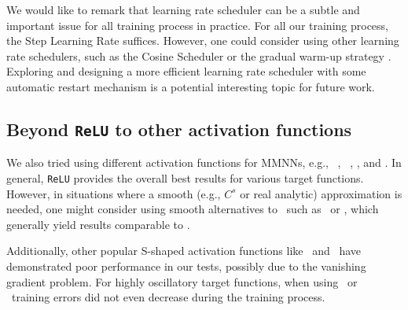 \documentclass[review,hidelinks,onefignum,onetabnum]{siamart250211}
\begin{document}
    We would like to remark that learning rate scheduler can be a subtle and important issue for all training process in practice. For all our training process, the Step Learning Rate suffices. However, one could consider using other learning rate schedulers, such as the Cosine Scheduler \cite{loshchilov2017sgdr} or the gradual warm-up strategy \cite{2017arXiv170602677G}. Exploring and designing a more efficient learning rate scheduler with some automatic restart mechanism is a potential interesting topic for future work.

    


\subsection{Beyond \texttt{ReLU} to other activation functions}
\label{sec:other:activation:functions}

We also tried using different activation functions for MMNNs, e.g., \GELU\ \cite{2016arXiv160608415H}, \Swish\ \cite{2017arXiv171005941R}, \Sigmoid, and \Tanh. In general, \texttt{ReLU} provides the overall best results for various target functions. 
However, in situations where a smooth (e.g., $C^s$ or real analytic) approximation  is needed, one might consider using smooth alternatives to \ReLU\ such as \GELU\  or \Swish, which generally yield results comparable to \ReLU.

Additionally, other popular S-shaped activation functions like \Sigmoid\ and \Tanh\ have demonstrated poor performance in our tests, possibly due to the vanishing gradient problem. For highly oscillatory target functions, when using \Sigmoid\ or \Tanh\ training errors did not even decrease  during the training process.
\end{document}
